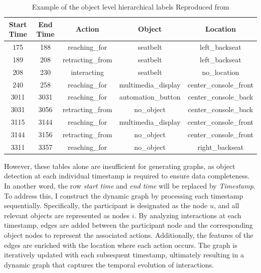 \begin{table}[h!]
    \centering
    \begin{tabular}{ccccc}
    \toprule
    \textbf{Start Time} & \textbf{End Time} & \textbf{Action}         & \textbf{Object}               & \textbf{Location}           \\ 
    \midrule
    175                 & 188               & reaching\_for           & seatbelt                     & left\_backseat              \\ 
    \midrule
    189                 & 208               & retracting\_from        & seatbelt                     & left\_backseat              \\ 
    \midrule
    208                 & 230               & interacting             & seatbelt                     & no\_location                \\ 
    \midrule
    240                 & 258               & reaching\_for           & multimedia\_display          & center\_console\_front      \\ 
    \midrule
    3011                & 3031              & reaching\_for           & automation\_button           & center\_console\_back       \\ 
    \midrule
    3031                & 3056              & retracting\_from        & no\_object                   & center\_console\_back       \\ 
    \midrule
    3115                & 3144              & reaching\_for           & multimedia\_display          & center\_console\_front      \\ 
    \midrule
    3144                & 3156              & retracting\_from        & no\_object                   & center\_console\_front      \\ 
    \midrule
    3311                & 3357              & reaching\_for           & no\_object                   & right\_backseat             \\ 
    \bottomrule
    \end{tabular}
    \caption{Example of the  object level hierarchical labels Reproduced from\cite{9009583}}
    \label{tab:hierarchical_labels_object}
    \end{table}
    


However, these tables alone are insufficient for generating graphs, as object detection at each individual timestamp is required to ensure data completeness. In another word, the row \textit{start time} and \textit{end time} will be replaced by \textit{Timestamp}. To address this, I construct the dynamic graph by processing each timestamp sequentially. Specifically, the participant is designated as the node $u$, and all relevant objects are represented as nodes $i$. By analyzing interactions at each timestamp, edges are added between the participant node and the corresponding object nodes to represent the associated actions. Additionally, the features of the edges are enriched with the location where each action occurs. The graph is iteratively updated with each subsequent timestamp, ultimately resulting in a dynamic graph that captures the temporal evolution of interactions.
    


